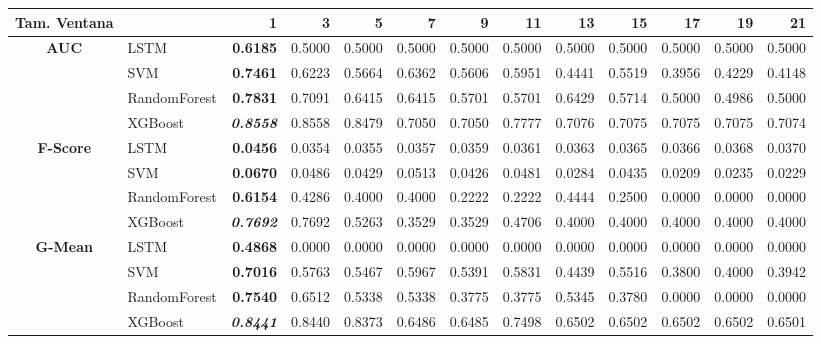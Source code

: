 \begin{table}[H]
	\centering
	\begin{adjustbox}{max width=14cm}
		\begin{tabular}{|c|l|r|r|r|r|r|r|r|r|r|r|r|}
			\hline
			\textbf{Tam. Ventana} &         &      1  &      3  &      5  &      7  &      9  &      11 &      13 &      15 &      17 &      19 &      21 \\
			\hline
			\textbf{AUC} &  LSTM & \textbf{  0.6185 } &  0.5000 &  0.5000 &  0.5000 &  0.5000 &  0.5000 &  0.5000 &  0.5000 &  0.5000 &  0.5000 &  0.5000 \\
			&  SVM & \textbf{  0.7461 } &  0.6223 &  0.5664 &  0.6362 &  0.5606 &  0.5951 &  0.4441 &  0.5519 &  0.3956 &  0.4229 &  0.4148 \\
			&  RandomForest & \textbf{  0.7831 } &  0.7091 &  0.6415 &  0.6415 &  0.5701 &  0.5701 &  0.6429 &  0.5714 &  0.5000 &  0.4986 &  0.5000 \\
			&  XGBoost & \textit{ \textbf{  0.8558 } } &  0.8558 &  0.8479 &  0.7050 &  0.7050 &  0.7777 &  0.7076 &  0.7075 &  0.7075 &  0.7075 &  0.7074 \\
			\hline
			\textbf{F-Score} &  LSTM & \textbf{  0.0456 } &  0.0354 &  0.0355 &  0.0357 &  0.0359 &  0.0361 &  0.0363 &  0.0365 &  0.0366 &  0.0368 &  0.0370 \\
			&  SVM & \textbf{  0.0670 } &  0.0486 &  0.0429 &  0.0513 &  0.0426 &  0.0481 &  0.0284 &  0.0435 &  0.0209 &  0.0235 &  0.0229 \\
			&  RandomForest & \textbf{  0.6154 } &  0.4286 &  0.4000 &  0.4000 &  0.2222 &  0.2222 &  0.4444 &  0.2500 &  0.0000 &  0.0000 &  0.0000 \\
			&  XGBoost & \textit{ \textbf{  0.7692 } } &  0.7692 &  0.5263 &  0.3529 &  0.3529 &  0.4706 &  0.4000 &  0.4000 &  0.4000 &  0.4000 &  0.4000 \\
			\hline
			\textbf{G-Mean} &  LSTM & \textbf{  0.4868 } &  0.0000 &  0.0000 &  0.0000 &  0.0000 &  0.0000 &  0.0000 &  0.0000 &  0.0000 &  0.0000 &  0.0000 \\
			&  SVM & \textbf{  0.7016 } &  0.5763 &  0.5467 &  0.5967 &  0.5391 &  0.5831 &  0.4439 &  0.5516 &  0.3800 &  0.4000 &  0.3942 \\
			&  RandomForest & \textbf{  0.7540 } &  0.6512 &  0.5338 &  0.5338 &  0.3775 &  0.3775 &  0.5345 &  0.3780 &  0.0000 &  0.0000 &  0.0000 \\
			&  XGBoost & \textit{ \textbf{  0.8441 } } &  0.8440 &  0.8373 &  0.6486 &  0.6485 &  0.7498 &  0.6502 &  0.6502 &  0.6502 &  0.6502 &  0.6501 \\

\end{tabular}
\end{adjustbox}
\end{table}
